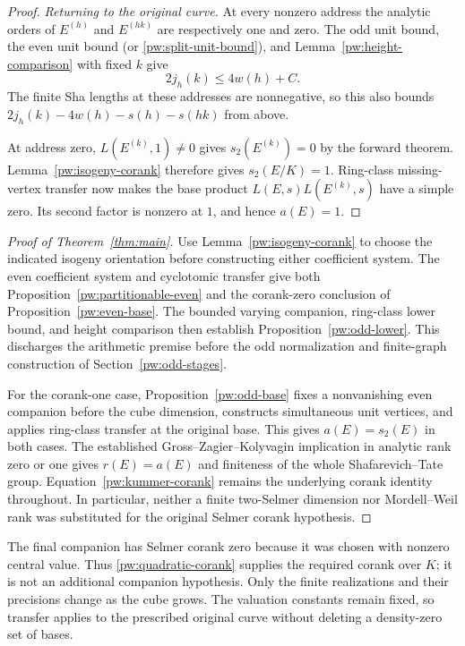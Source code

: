 \begin{proof}
\emph{Returning to the original curve.}
At every nonzero address the analytic orders of $E^{(h)}$ and $E^{(hk)}$
are respectively one and zero.  The odd unit bound, the even unit bound
(or \eqref{pw:split-unit-bound}), and
Lemma~\ref{pw:height-comparison} with fixed $k$ give
\[
 2j_h(k)\le 4w(h)+C.
\]
The finite Sha lengths at these addresses are nonnegative, so this also
bounds $2j_h(k)-4w(h)-s(h)-s(hk)$ from above.

At address zero, $L(E^{(k)},1)\ne0$ gives $s_2(E^{(k)})=0$ by the
forward theorem.  Lemma~\ref{pw:isogeny-corank} therefore gives
$s_2(E/K)=1$.  Ring-class missing-vertex transfer now makes the base
product $L(E,s)L(E^{(k)},s)$ have a simple zero.  Its second factor is
nonzero at $1$, and hence $a(E)=1$.
\end{proof}

\begin{proof}[Proof of Theorem~\ref{thm:main}]
Use Lemma~\ref{pw:isogeny-corank} to choose the indicated isogeny
orientation before constructing either coefficient system.
The even coefficient system and cyclotomic transfer give both
Proposition~\ref{pw:partitionable-even} and the corank-zero conclusion
of Proposition~\ref{pw:even-base}.  The bounded varying companion,
ring-class lower bound, and height comparison then establish
Proposition~\ref{pw:odd-lower}.  This discharges the arithmetic premise
before the odd normalization and finite-graph construction of
Section~\ref{pw:odd-stages}.

For the corank-one case, Proposition~\ref{pw:odd-base} fixes a nonvanishing
even companion before the cube dimension, constructs simultaneous unit
vertices, and applies ring-class transfer at the original base.  This gives
$a(E)=s_2(E)$ in both cases.  The established Gross--Zagier--Kolyvagin implication in
analytic rank zero or one gives $r(E)=a(E)$ and finiteness of the whole
Shafarevich--Tate group.  Equation~\eqref{pw:kummer-corank} remains the
underlying corank identity throughout.  In particular, neither a finite
two-Selmer dimension nor Mordell--Weil rank was substituted for the
original Selmer corank hypothesis.
\end{proof}

\begin{remark}\label{pw:status}
The final companion has Selmer corank zero because it was chosen with
nonzero central value.  Thus \eqref{pw:quadratic-corank} supplies the
required corank over $K$; it is not an additional companion hypothesis.
Only the finite realizations and their precisions change as the cube
grows.  The valuation constants remain fixed, so transfer applies to the
prescribed original curve without deleting a density-zero set of bases.
\end{remark}
